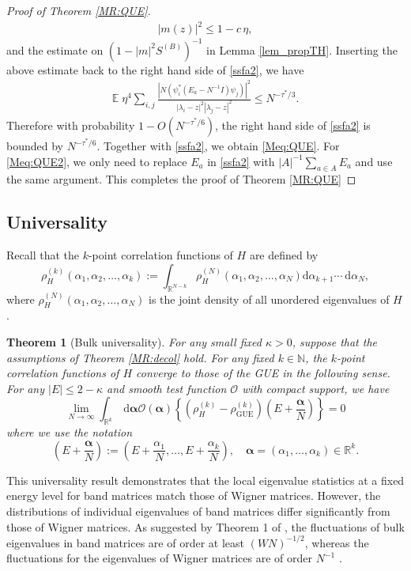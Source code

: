 \documentclass[10pt,reqno]{article}
\theoremstyle{plain} %
\newtheorem{theorem}{Theorem}[section]
\theoremstyle{remark}
\numberwithin{equation}{section}
\begin{document}
\begin{proof}[Proof of Theorem \ref{MR:QUE}]
\begin{align}\label{me}
|m(z)|^2 \le 1-c\,\eta, 
\end{align}
and the estimate on $(1-|m|^2 S^{(B)})^{-1}$ in  Lemma \ref{lem_propTH}.  Inserting the  above estimate back to the right hand side  of \eqref{ssfa2}, we have 
\begin{align}\label{que2}
\mathbb E \; \eta^4 \sum_{i, j  } \frac{ \left|N (\psi_i^*\left(E_a-N^{-1}I\right) \psi_j)\right|^2}{\left|\lambda_i-z\right|^2\left|\lambda_j-z\right|^2}
 \le N^{- \tau ^* /3}.
\end{align}
 Therefore with probability $1-O(N^{- \tau ^* /6})$, the right hand side  of \eqref{ssfa2} is bounded by $N^{- \tau ^* /6}$. Together with \eqref{ssfa2}, we obtain \eqref{Meq:QUE}.  For \eqref{Meq:QUE2},  we  only need to replace $E_a$ in \eqref{ssfa2} with $|A|^{-1}\sum_{a\in A} E_a$ and use the same argument. This completes the proof of Theorem \ref{MR:QUE}

\end{proof}


 \subsection{Universality} 
Recall that the $k$-point correlation functions  of $H$ are defined  by
\[
\rho_H^{(k)}\left(\alpha_1, \alpha_2, \ldots, \alpha_k\right):=\int_{\mathbb{R}^{N-k}} \rho_H^{(N)}\left(\alpha_1, \alpha_2, \ldots, \alpha_N\right) \mathrm{d} \alpha_{k+1} \cdots \mathrm{~d} \alpha_N, 
\]
where $\rho_H^{(N)}\left(\alpha_1, \alpha_2, \ldots, \alpha_N\right)$ is the joint density of all unordered eigenvalues of $H$. 

 \begin{theorem}[Bulk universality]\label{Thm: B_Univ}
For any small fixed $\kappa>0$, suppose that the assumptions of Theorem \ref{MR:decol} hold. For any fixed $k\in \mathbb N$, the $k$-point correlation functions of $H$ converge to those of the GUE in the following sense. For any $|E| \leq 2-\kappa$ and smooth test function $\mathcal{O}$ with compact support, we have
 \begin{equation}\label{eq:universality}
\lim _{N \rightarrow \infty} \int_{\mathbb{R}^k} \mathrm{~d} \boldsymbol{\alpha} \mathcal{O}(\boldsymbol{\alpha})\left\{\left(\rho_H^{(k)}-\rho_{\mathrm{GUE}}^{(k)}\right)\left(E+\frac{\boldsymbol{\alpha}}{N}\right)\right\}=0 
 \end{equation}  
where we use the notation
\[
(E+\frac{\boldsymbol{\alpha}}{N})
    :=
    \left(E+\frac{\alpha_1}{N},\ldots,E+\frac{\alpha_k}{N}\right), \quad \boldsymbol{\alpha}=(\alpha_1,\ldots,\alpha_k)\in\mathbb R^k.
\]
 \end{theorem}
This universality result demonstrates that the local eigenvalue statistics at a fixed energy level for band matrices match those of Wigner matrices. However, the distributions of individual eigenvalues of band matrices differ significantly from those of Wigner matrices. As suggested by Theorem 1 of \cite{Sch2015}, the fluctuations of bulk eigenvalues in band matrices are of order at least $(WN)^{-1/2}$, whereas the fluctuations for the eigenvalues of Wigner matrices are of order $ N^{-1}$ \cite{erdHos2012rigidity}.
 
\end{document}
